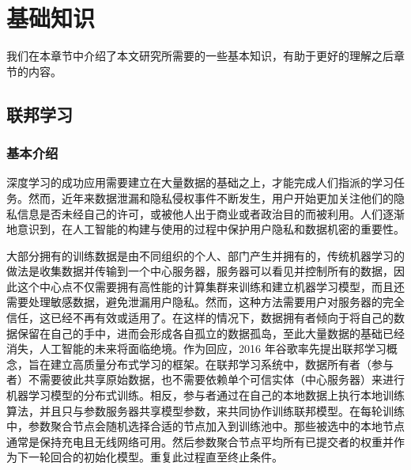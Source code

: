 \chapter{基础知识}
\label{ch2}
我们在本章节中介绍了本文研究所需要的一些基本知识，有助于更好的理解之后章节的内容。

\section{联邦学习}

\subsection{基本介绍}
深度学习的成功应用需要建立在大量数据的基础之上，才能完成人们指派的学习任务。然而，近年来数据泄漏和隐私侵权事件不断发生，用户开始更加关注他们的隐私信息是否未经自己的许可，或被他人出于商业或者政治目的而被利用。人们逐渐地意识到，在人工智能的构建与使用的过程中保护用户隐私和数据机密的重要性。

大部分拥有的训练数据是由不同组织的个人、部门产生并拥有的，传统机器学习的做法是收集数据并传输到一个中心服务器，服务器可以看见并控制所有的数据，因此这个中心点不仅需要拥有高性能的计算集群来训练和建立机器学习模型，而且还需要处理敏感数据，避免泄漏用户隐私。然而，这种方法需要用户对服务器的完全信任，这已经不再有效或适用了。在这样的情况下，数据拥有者倾向于将自己的数据保留在自己的手中，进而会形成各自孤立的数据孤岛，至此大量数据的基础已经消失，人工智能的未来将面临绝境。作为回应，2016 年谷歌率先提出联邦学习概念，旨在建立高质量分布式学习的框架。在联邦学习系统中，数据所有者（参与者）不需要彼此共享原始数据，也不需要依赖单个可信实体（中心服务器）来进行机器学习模型的分布式训练。相反，参与者通过在自己的本地数据上执行本地训练算法，并且只与参数服务器共享模型参数，来共同协作训练联邦模型。在每轮训练中，参数聚合节点会随机选择合适的节点加入到训练池中。那些被选中的本地节点通常是保持充电且无线网络可用。然后参数聚合节点平均所有已提交者的权重并作为下一轮回合的初始化模型。重复此过程直至终止条件。

